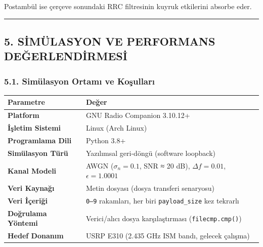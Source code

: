 \documentclass[
]{IEEEtran}
\newcounter{none} %
\begin{document}
Postambül ise çerçeve sonundaki RRC filtresinin kuyruk etkilerini
absorbe eder.

\begin{center}\rule{0.5\linewidth}{0.5pt}\end{center}

\subsection{5. SİMÜLASYON VE PERFORMANS
DEĞERLENDİRMESİ}\label{simuxfclasyon-ve-performans-deux11ferlendirmesi}

\subsubsection{5.1. Simülasyon Ortamı ve
Koşulları}\label{simuxfclasyon-ortamux131-ve-koux15fullarux131}

{\def\LTcaptype{none} %
\begin{longtable}[]{@{}
  >{\raggedright\arraybackslash}p{}
  >{\raggedright\arraybackslash}p{}@{}}
\toprule\noalign{}
\begin{minipage}[b]{\linewidth}\raggedright
Parametre
\end{minipage} & \begin{minipage}[b]{\linewidth}\raggedright
Değer
\end{minipage} \\
\midrule\noalign{}
\endhead
\bottomrule\noalign{}
\endlastfoot
\textbf{Platform} & GNU Radio Companion 3.10.12+ \\
\textbf{İşletim Sistemi} & Linux (Arch Linux) \\
\textbf{Programlama Dili} & Python 3.8+ \\
\textbf{Simülasyon Türü} & Yazılımsal geri-döngü (software loopback) \\
\textbf{Kanal Modeli} & AWGN (\(\sigma_n = 0.1\), SNR ≈ 20 dB),
\(\Delta f = 0.01\), \(\epsilon = 1.0001\) \\
\textbf{Veri Kaynağı} & Metin dosyası (dosya transferi senaryosu) \\
\textbf{Veri İçeriği} & \texttt{0–9} rakamları, her biri
\texttt{payload\_size} kez tekrarlı \\
\textbf{Doğrulama Yöntemi} & Verici/alıcı dosya karşılaştırması
(\texttt{filecmp.cmp()}) \\
\textbf{Hedef Donanım} & USRP E310 (2.435 GHz ISM bandı, gelecek
çalışma) \\
\end{longtable}
}
\end{document}
